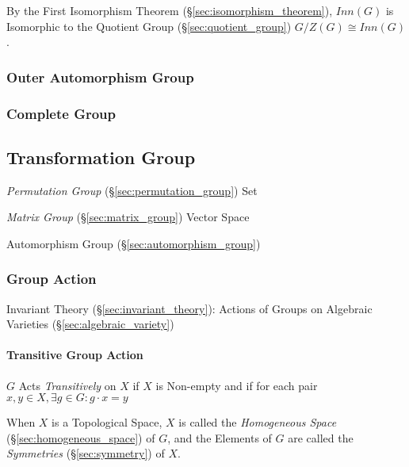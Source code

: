 \begin{itemize}
By the First Isomorphism Theorem (\S\ref{sec:isomorphism_theorem}),
$Inn(G)$ is Isomorphic to the Quotient Group
(\S\ref{sec:quotient_group}) $G / Z(G) \cong Inn(G)$.



\subsubsection{Outer Automorphism Group}\label{sec:outer_automorphism_group}

\subsubsection{Complete Group}\label{sec:complete_group}



\subsection{Transformation Group}\label{sec:transformation_group}

\emph{Permutation Group} (\S\ref{sec:permutation_group}) Set

\emph{Matrix Group} (\S\ref{sec:matrix_group}) Vector Space

Automorphism Group (\S\ref{sec:automorphism_group})



\subsubsection{Group Action}\label{sec:group_action}

Invariant Theory (\S\ref{sec:invariant_theory}): Actions of Groups on
Algebraic Varieties (\S\ref{sec:algebraic_variety})



\paragraph{Transitive Group Action}\label{sec:transitive_action}\hfill

$G$ Acts \emph{Transitively} on $X$ if $X$ is Non-empty and if for each pair
$x,y \in X, \exists g \in G : g \cdot x = y$

When $X$ is a Topological Space, $X$ is called the \emph{Homogeneous Space}
(\S\ref{sec:homogeneous_space}) of $G$, and the Elements of $G$ are called the
\emph{Symmetries} (\S\ref{sec:symmetry}) of $X$.




\end{itemize}
